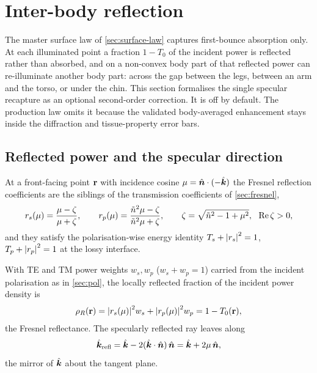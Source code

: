 \section{Inter-body reflection}\label{sec:interbody}

The master surface law of \cref{sec:surface-law} captures first-bounce
absorption only. At each illuminated point a fraction $1-T_0$ of the
incident power is reflected rather than absorbed, and on a non-convex
body part of that reflected power can re-illuminate another body part:
across the gap between the legs, between an arm and the torso, or under
the chin. This section formalises the single specular recapture as an
optional second-order correction. It is off by default. The production
law omits it because the validated body-averaged enhancement stays
inside the diffraction and tissue-property error bars.

\subsection{Reflected power and the specular direction}

At a front-facing point $\mathbf{r}$ with incidence cosine
$\mu=\hat{\bm{n}}\cdot(-\hat{\bm{k}})$ the Fresnel reflection coefficients are the
siblings of the transmission coefficients of \cref{sec:fresnel},
\begin{equation}\label{eq:r-coeffs}
  r_s(\mu)=\frac{\mu-\zeta}{\mu+\zeta},\qquad
  r_p(\mu)=\frac{\tilde{n}^2\mu-\zeta}{\tilde{n}^2\mu+\zeta},\qquad
  \zeta=\sqrt{\tilde{n}^2-1+\mu^2},\ \ \operatorname{Re}\zeta>0,
\end{equation}
and they satisfy the polarisation-wise energy identity
$T_s+\abs{r_s}^2=1$, $T_p+\abs{r_p}^2=1$ at the lossy interface.

\begin{definition}\label{def:rho-refl}
With TE and TM power weights $w_s,w_p$ ($w_s+w_p=1$) carried from the
incident polarisation as in \cref{sec:pol}, the locally reflected
fraction of the incident power density is
\begin{equation}\label{eq:rho-refl}
  \rho_R(\mathbf{r})=\abs{r_s(\mu)}^2 w_s+\abs{r_p(\mu)}^2 w_p
            =1-T_0(\mathbf{r}),
\end{equation}
the Fresnel reflectance. The specularly reflected ray leaves along
\begin{equation}\label{eq:k-refl}
  \hat{\bm{k}}_{\mathrm{refl}}=\hat{\bm{k}}-2(\hat{\bm{k}}\cdot\hat{\bm{n}})\,\hat{\bm{n}}
                       =\hat{\bm{k}}+2\mu\,\hat{\bm{n}},
\end{equation}
the mirror of $\hat{\bm{k}}$ about the tangent plane.
\end{definition}

